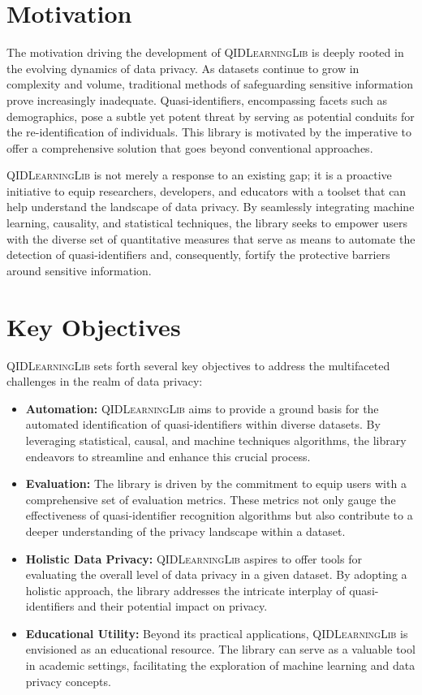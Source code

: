 \documentclass[twoside,11pt]{article}
\begin{document}
\section{Motivation}
The motivation driving the development of \textsc{QIDLearningLib} is deeply rooted in the evolving dynamics of data privacy. As datasets continue to grow in complexity and volume, traditional methods of safeguarding sensitive information prove increasingly inadequate. Quasi-identifiers, encompassing facets such as demographics, pose a subtle yet potent threat by serving as potential conduits for the re-identification of individuals. This library is motivated by the imperative to offer a comprehensive solution that goes beyond conventional approaches.

\textsc{QIDLearningLib} is not merely a response to an existing gap; it is a proactive initiative to equip researchers, developers, and educators with a  toolset that can help understand the landscape of data privacy. By seamlessly integrating machine learning, causality, and statistical techniques, the library seeks to empower users with the diverse set of quantitative measures that serve as means to automate the detection of quasi-identifiers and, consequently, fortify the protective barriers around sensitive information.

\section{Key Objectives}
\textsc{QIDLearningLib} sets forth several key objectives to address the multifaceted challenges in the realm of data privacy:

\begin{itemize}
    \item \textbf{Automation:} \textsc{QIDLearningLib} aims to provide a ground basis for the automated identification of quasi-identifiers within diverse datasets. By leveraging statistical, causal, and machine techniques algorithms, the library endeavors to streamline and enhance this crucial process.
    
    \item \textbf{Evaluation:} The library is driven by the commitment to equip users with a comprehensive set of evaluation metrics. These metrics not only gauge the effectiveness of quasi-identifier recognition algorithms but also contribute to a deeper understanding of the privacy landscape within a dataset.
    
    \item \textbf{Holistic Data Privacy:} \textsc{QIDLearningLib} aspires to offer tools for evaluating the overall level of data privacy in a given dataset. By adopting a holistic approach, the library addresses the intricate interplay of quasi-identifiers and their potential impact on privacy.
    
    \item \textbf{Educational Utility:} Beyond its practical applications, \textsc{QIDLearningLib} is envisioned as an educational resource. The library can serve as a valuable tool in academic settings, facilitating the exploration of machine learning and data privacy concepts.
\end{itemize}
\end{document}
